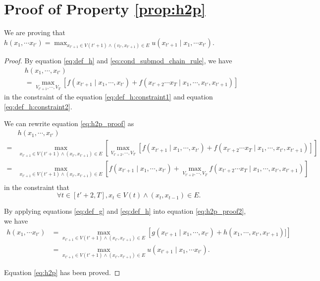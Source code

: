 \documentclass[12pt]{article}
\begin{document}
\section{Proof of Property \ref{prop:h2p}}
\label{app:proof_prop_h2p}

We are proving that $ h( x_{1}, \cdots x_{t'} ) = \max_{x_{t'+1} \in V(t'+1) \land (v_{t'}, x_{t'+1}) \in E} u(x_{t'+1} \mid x_{1}, \cdots x_{t'} ) $.

\begin{proof}

By equation \eqref{eq:def_h} and \eqref{eq:cond_submod_chain_rule}, we have
\begin{equation}
\label{eq:h2p_proof}
\begin{aligned}
& h(x_{1} , \cdots, x_{t'} ) \\
& = \max_{V_{t'+1}, \cdots , V_{T}} [ f(x_{t'+1} \mid  x_{1}, \cdots , x_{t'}) + f(x_{t'+2} \cdots x_{T} \mid x_{1}, \cdots , x_{t'}, x_{t'+1}) ] 
\end{aligned}
\end{equation}
in the constraint of the equation \eqref{eq:def_h:constraint1} and equation \eqref{eq:def_h:constraint2}.

We can rewrite equation \eqref{eq:h2p_proof} as
\begin{equation}
\label{eq:h2p_proof2}
\begin{aligned}
& h(x_{1} , \cdots, x_{t'} ) \\
= & \max_{ x_{t'+1} \in V(t'+1) \land ( x_{t'}, x_{t'+1} ) \in E } \left[  \max_{V_{t'+2}, \cdots , V_{T}} [ f(x_{t'+1} \mid  x_{1}, \cdots , x_{t'}) + f(x_{t'+2} \cdots x_{T} \mid x_{1}, \cdots , x_{t'}, x_{t'+1}) ] \right] \\
= & \max_{ x_{t'+1} \in V(t'+1) \land ( x_{t'}, x_{t'+1} ) \in E } \left[ f(x_{t'+1} \mid  x_{1}, \cdots , x_{t'}) + \max_{V_{t'+2}, \cdots , V_{T}} f(x_{t'+2} \cdots x_{T} \mid x_{1}, \cdots , x_{t'}, x_{t'+1}) \right] \\
\end{aligned}
\end{equation}
in the constraint that
\begin{equation}
\forall t \in [t'+2, T], x_{t} \in V(t) \land ( x_{t}, x_{t-1} ) \in E. 
\end{equation}


By applying equations \eqref{eq:def_g} and \eqref{eq:def_h} into equation \eqref{eq:h2p_proof2}, we have
\begin{equation}
\begin{aligned}
h( x_{1}, \cdots x_{t'} )  & = \max_{ x_{t'+1} \in V(t'+1) \land ( x_{t'}, x_{t'+1} ) \in E } \left[  g(x_{t'+1} \mid  x_{1}, \cdots , x_{t'}) + h( x_{1}, \cdots , x_{t'}, x_{t'+1}) ] \right] \\
& = \max_{ x_{t'+1} \in V(t'+1) \land ( x_{t'}, x_{t'+1} ) \in E } u(x_{t'+1} \mid x_{1}, \cdots x_{t'} ).
\end{aligned}
\end{equation}

Equation \eqref{eq:h2p} has been proved.

\end{proof}
\end{document}
